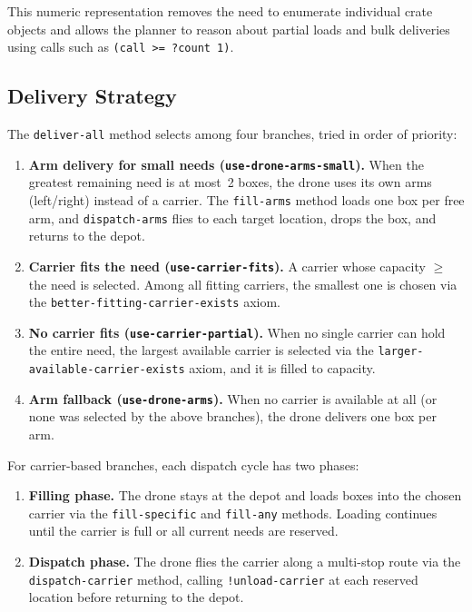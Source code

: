 \documentclass{article}
\begin{document}
This numeric representation removes the need to enumerate individual crate objects and allows the planner to reason about partial loads and bulk deliveries using calls such as \texttt{(call >= ?count 1)}.

\subsection{Delivery Strategy}

The \texttt{deliver-all} method selects among four branches, tried in order of priority:

\begin{enumerate}
    \item \textbf{Arm delivery for small needs (\texttt{use-drone-arms-small}).} When the greatest remaining need is at most~2 boxes, the drone uses its own arms (left/right) instead of a carrier. The \texttt{fill-arms} method loads one box per free arm, and \texttt{dispatch-arms} flies to each target location, drops the box, and returns to the depot.
    \item \textbf{Carrier fits the need (\texttt{use-carrier-fits}).} A carrier whose capacity $\geq$ the need is selected. Among all fitting carriers, the smallest one is chosen via the \texttt{better-fitting-carrier-exists} axiom.
    \item \textbf{No carrier fits (\texttt{use-carrier-partial}).} When no single carrier can hold the entire need, the largest available carrier is selected via the \texttt{larger-available-carrier-exists} axiom, and it is filled to capacity.
    \item \textbf{Arm fallback (\texttt{use-drone-arms}).} When no carrier is available at all (or none was selected by the above branches), the drone delivers one box per arm.
\end{enumerate}

For carrier-based branches, each dispatch cycle has two phases:

\begin{enumerate}
    \item \textbf{Filling phase.} The drone stays at the depot and loads boxes into the chosen carrier via the \texttt{fill-specific} and \texttt{fill-any} methods. Loading continues until the carrier is full or all current needs are reserved.
    \item \textbf{Dispatch phase.} The drone flies the carrier along a multi-stop route via the \texttt{dispatch-carrier} method, calling \texttt{!unload-carrier} at each reserved location before returning to the depot.
\end{enumerate}
\end{document}
